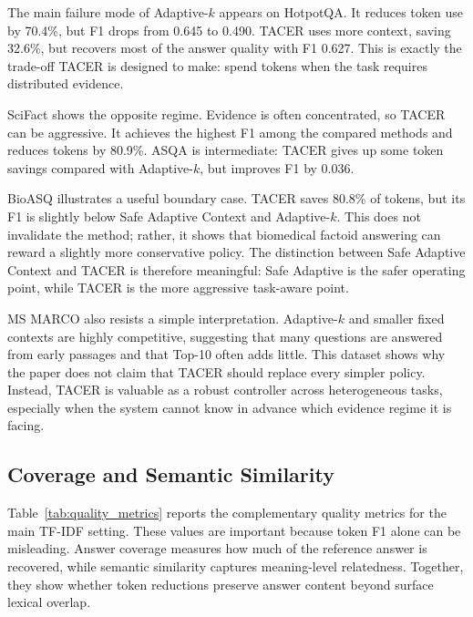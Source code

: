 \documentclass[11pt]{article}
\begin{document}
The main failure mode of Adaptive-$k$ appears on HotpotQA. It reduces token use by 70.4\%, but F1 drops from 0.645 to 0.490. TACER uses more context, saving 32.6\%, but recovers most of the answer quality with F1 0.627. This is exactly the trade-off TACER is designed to make: spend tokens when the task requires distributed evidence.

SciFact shows the opposite regime. Evidence is often concentrated, so TACER can be aggressive. It achieves the highest F1 among the compared methods and reduces tokens by 80.9\%. ASQA is intermediate: TACER gives up some token savings compared with Adaptive-$k$, but improves F1 by 0.036.

BioASQ illustrates a useful boundary case. TACER saves 80.8\% of tokens, but its F1 is slightly below Safe Adaptive Context and Adaptive-$k$. This does not invalidate the method; rather, it shows that biomedical factoid answering can reward a slightly more conservative policy. The distinction between Safe Adaptive Context and TACER is therefore meaningful: Safe Adaptive is the safer operating point, while TACER is the more aggressive task-aware point.

MS MARCO also resists a simple interpretation. Adaptive-$k$ and smaller fixed contexts are highly competitive, suggesting that many questions are answered from early passages and that Top-10 often adds little. This dataset shows why the paper does not claim that TACER should replace every simpler policy. Instead, TACER is valuable as a robust controller across heterogeneous tasks, especially when the system cannot know in advance which evidence regime it is facing.

\subsection{Coverage and Semantic Similarity}

Table~\ref{tab:quality_metrics} reports the complementary quality metrics for the main TF-IDF setting. These values are important because token F1 alone can be misleading. Answer coverage measures how much of the reference answer is recovered, while semantic similarity captures meaning-level relatedness. Together, they show whether token reductions preserve answer content beyond surface lexical overlap.
\end{document}
